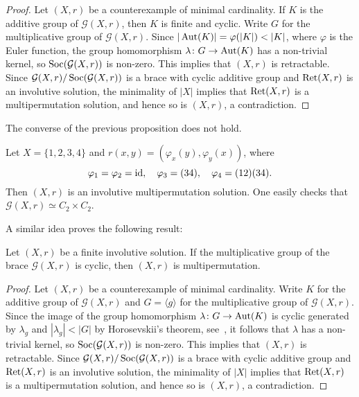 \begin{proof}
    Let $(X,r)$ be a counterexample of minimal cardinality. If $K$ is the additive 
    group of $\mathcal{G}(X,r)$, then $K$ is finite and cyclic. 
    Write $G$ for the multiplicative group of $\mathcal{G}(X,r)$. 
    Since $|\Aut(K)|=\varphi(|K|)<|K|$, where $\varphi$ is the Euler function, 
    the group homomorphism $\lambda\colon G\to\operatorname{Aut}(K)$ 
    has a non-trivial kernel, so $\operatorname{Soc}(\mathcal{G}(X,r))$ is non-zero.  
    This implies that $(X,r)$ is retractable. 
    Since $\mathcal{G}(X,r)/\operatorname{Soc}(\mathcal{G}(X,r))$ is a brace with cyclic 
    additive group and $\operatorname{Ret}(X,r)$ is an involutive solution, the 
    minimality of $|X|$ implies that 
    $\operatorname{Ret}(X,r)$ is a multipermutation solution, and hence so is $(X,r)$, 
    a contradiction. 
\end{proof}

The converse of the previous proposition does not hold. 

\begin{example}
	Let $X=\{1,2,3,4\}$ and $r(x,y)=(\varphi_x(y),\varphi_y(x))$, where
	\[
		\varphi_1=\varphi_2=\operatorname{id},\quad
		\varphi_3=(34),\quad
		\varphi_4=(12)(34).
 	\]
	Then $(X,r)$ is an involutive multipermutation solution. One easily checks
	that $\mathcal{G}(X,r)\simeq C_2\times C_2$.
\end{example}

A similar idea proves the following result:

\begin{theorem}
\label{thm:mul_cyclic}
Let $(X,r)$ be a finite involutive solution. If the multiplicative group 
of the brace $\mathcal{G}(X,r)$ is cyclic, then $(X,r)$ 
is multipermutation.
\end{theorem}

\begin{proof}
    Let $(X,r)$ be a counterexample of minimal cardinality. Write $K$ for the additive 
    group of $\mathcal{G}(X,r)$ and 
    $G=\langle g\rangle$ for the multiplicative group of $\mathcal{G}(X,r)$. Since 
    the image of the group homomorphism $\lambda\colon G\to\operatorname{Aut}(K)$ is cyclic generated by $\lambda_g$ and 
    $|\lambda_g|<|G|$ by Horosevskii's theorem, see~\cite[Corollary 3.3]{MR2426855}, it follows that 
    $\lambda$ has a non-trivial kernel, so $\operatorname{Soc}(\mathcal{G}(X,r))$ is non-zero.  
    This implies that $(X,r)$ is retractable. 
    Since $\mathcal{G}(X,r)/\operatorname{Soc}(\mathcal{G}(X,r))$ is a brace with cyclic 
    additive group and $\operatorname{Ret}(X,r)$ is an involutive solution, the 
    minimality of $|X|$ implies that 
    $\operatorname{Ret}(X,r)$ is a multipermutation solution, and hence so is $(X,r)$, 
    a contradiction. 
\end{proof}

